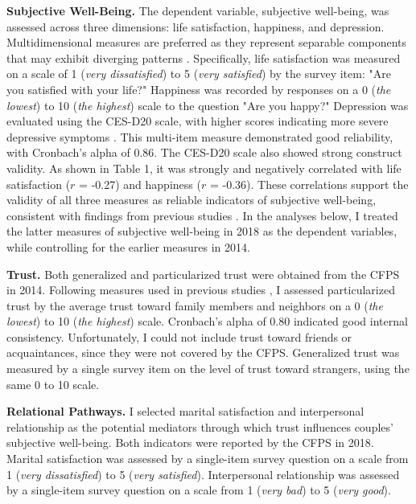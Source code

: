 \textbf{Subjective Well-Being.} The dependent variable, subjective well-being, was assessed across three dimensions: life satisfaction, happiness, and depression. Multidimensional measures are preferred as they represent separable components that may exhibit diverging patterns \parencite{pavotAssessmentSubjectiveWellBeing2008}. Specifically, life satisfaction was measured on a scale of 1 (\textit{very dissatisfied}) to 5 (\textit{very satisfied}) by the survey item: "Are you satisfied with your life?" Happiness was recorded by responses on a 0 (\textit{the lowest}) to 10 (\textit{the highest}) scale to the question "Are you happy?" Depression was evaluated using the CES-D20 scale, with higher scores indicating more severe depressive symptoms \parencite{radloffCESDScaleSelfReport1977}. This multi-item measure demonstrated good reliability, with Cronbach's alpha of 0.86. The CES-D20 scale also showed strong construct validity. As shown in Table 1, it was strongly and negatively correlated with life satisfaction ($r$ = -0.27) and happiness ($r$ = -0.36).  These correlations support the validity of all three measures as reliable indicators of subjective well-being, consistent with findings from previous studies \parencite{dienerSubjectiveWellBeingScience2009}. In the analyses below, I treated the latter measures of subjective well-being in 2018 as the dependent variables, while controlling for the earlier measures in 2014.

\textbf{Trust.} Both generalized and particularized trust were obtained from the CFPS in 2014. Following measures used in previous studies \parencite{churchillTrustSocialNetworks2017,baiSocialTrustPattern2019,kramerIngroupOutgroupTrustBarriers2018}, I assessed particularized trust by the average trust toward family members and neighbors on a 0 (\textit{the lowest}) to 10 (\textit{the highest}) scale. Cronbach's alpha of 0.80 indicated good internal consistency. Unfortunately, I could not include trust toward friends or acquaintances, since they were not covered by the CFPS. Generalized trust was measured by a single survey item on the level of trust toward strangers, using the same 0 to 10 scale.

\textbf{Relational Pathways.} I selected marital satisfaction and interpersonal relationship as the potential mediators through which trust influences couples' subjective well-being. Both indicators were reported by the CFPS in 2018. Marital satisfaction was assessed by a single-item survey question on a scale from 1 (\textit{very dissatisfied}) to 5 (\textit{very satisfied}). Interpersonal relationship was assessed by a single-item survey question on a scale from 1 (\textit{very bad}) to 5 (\textit{very good}).

